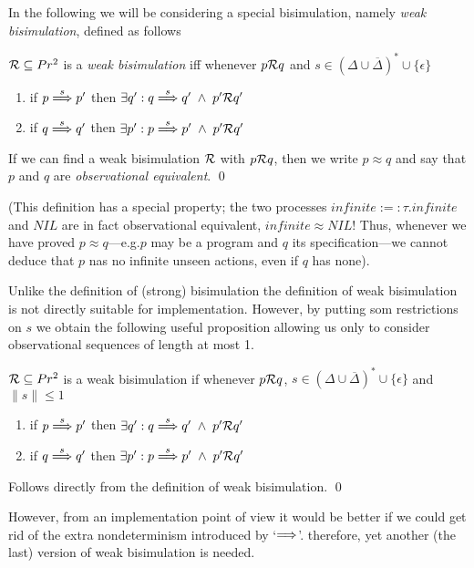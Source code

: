 In the following we will be considering a special bisimulation, namely {\it weak bisimulation\/}, defined as follows

\begin{definition}\label{defWeakBisim}
${\cal R}\subseteq Pr^2$ is a {\em weak bisimulation\/} iff whenever $p{\cal R}q$ and $s\in (\Delta\cup\overline{\Delta})^* \cup \{\epsilon\}$
\begin{enumerate}
\item if $p\stackrel{s}{\Longrightarrow}p'$ then $\exists q': q\stackrel{s}{\Longrightarrow}q'\;\wedge\; p'{\cal R}q'$
\item if $q\stackrel{s}{\Longrightarrow}q'$ then $\exists p': p\stackrel{s}{\Longrightarrow}p'\;\wedge\; p'{\cal R}q'$
\end{enumerate}
If we can find a weak bisimulation $\cal R$ with $p{\cal R}q$, then we write $p\approx q$ and say that $p$ and $q$ are {\em observational equivalent\/}.
\qed
\end{definition}

(This definition has a special property; the two processes $infinite :=: \tau.infinite$ and $NIL$ are in fact observational equivalent, $infinite\approx NIL$! Thus, whenever we have proved $p\approx q$---e.g.\@ $p$ may be a program and $q$ its specification---we cannot deduce that $p$ nas no infinite unseen actions, even if $q$ has none).

Unlike the definition of (strong) bisimulation the definition of weak bisimulation is not directly suitable for implementation. However, by putting som restrictions on $s$ we obtain the following useful proposition allowing us only to consider observational sequences of length at most 1.

\begin{proposition}\label{propWeakBisimI}
${\cal R}\subseteq Pr^2$ is a weak bisimulation if whenever $p{\cal R}q$, $s\in (\Delta\cup\overline{\Delta})^*\cup\{\epsilon\}$ and $\|s\|\leq1$
\begin{enumerate}
\item if $p\stackrel{s}{\Longrightarrow}p'$ then $\exists q': q\stackrel{s}{\Longrightarrow}q'\;\wedge\; p'{\cal R}q'$
\item if $q\stackrel{s}{\Longrightarrow}q'$ then $\exists p': p\stackrel{s}{\Longrightarrow}p'\;\wedge\; p'{\cal R}q'$
\end{enumerate}
\proof Follows directly from the definition of weak bisimulation.
\qed
\end{proposition}

\noindent
However, from an implementation point of view it would be better if we could get rid of the extra nondeterminism introduced by `$\stackrel{}{\Longrightarrow}$'. therefore, yet another (the last) version of weak bisimulation is needed.

